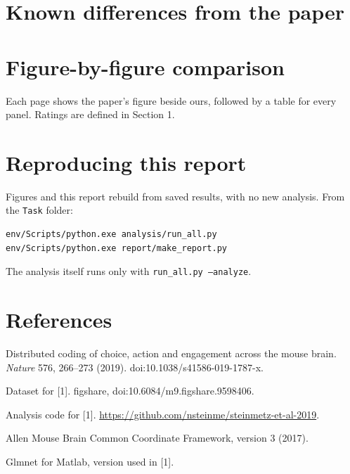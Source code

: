 \documentclass[11pt,a4paper]{article}
\begin{document}
\section{Known differences from the paper}



\section{Figure-by-figure comparison}
\label{sec:figures}

Each page shows the paper's figure beside ours, followed by a table for every panel. Ratings are defined in Section 1.



\newpage
\section{Reproducing this report}

Figures and this report rebuild from saved results, with no new analysis. From the \texttt{Task} folder:
\begin{verbatim}
env/Scripts/python.exe analysis/run_all.py
env/Scripts/python.exe report/make_report.py
\end{verbatim}
The analysis itself runs only with \texttt{run\_all.py --analyze}.

\section*{References}
\begin{enumerate}[label={[\arabic*]},leftmargin=*]
\item Distributed coding of choice, action and engagement across the mouse brain. \emph{Nature} 576, 266--273 (2019). doi:10.1038/s41586-019-1787-x.
\item Dataset for [1]. figshare, doi:10.6084/m9.figshare.9598406.
\item Analysis code for [1]. \url{https://github.com/nsteinme/steinmetz-et-al-2019}.
\item Allen Mouse Brain Common Coordinate Framework, version 3 (2017).
\item Glmnet for Matlab, version used in [1].
\end{enumerate}
\end{document}
